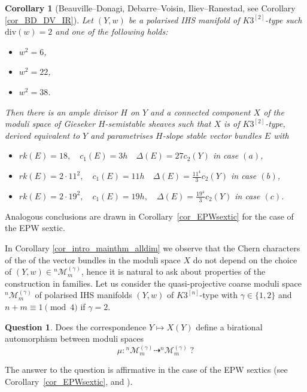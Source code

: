 \documentclass[12pt,a4paper]{amsart}
\theoremstyle{plain}
\newtheorem{maincor}[mainthm]{Corollary}
\theoremstyle{definition}
\newtheorem{mainquest}{Question}
\theoremstyle{remark}
\newcommand{\dv}{\mathrm{div}}
\newcommand{\cc}{c}
\begin{document}
\begin{maincor}[{Beauville--Donagi, Debarre--Voisin, Iliev--Ranestad, see Corollary \ref{cor_BD_DV_IR}}] Let $(Y,w)$ be a  polarised IHS manifold  of $K3^{[2]}$-type such $\dv(w)=2$ and one of the following holds:
\begin{itemize}
    \item [{\normalfont{(a)}}] $w^2=6$,
    \item [{\normalfont{(b)}}] $w^2=22$, 
    \item [{\normalfont{(c)}}] $w^2=38$.
\end{itemize}
Then there is an ample divisor $H$ on $Y$ and a connected component $X$ of the moduli space of Gieseker $H$-semistable sheaves such that $X$ is of $K3^{[2]}$-type, derived equivalent to $Y$ and parametrises $H$-slope stable vector bundles $E$ with
\begin{itemize}
    \item [{\normalfont{(a')}}] $rk(E)=18,\quad c_1(E)=3h \quad \Delta(E)=27\cc_2(Y)$ in case $(a)$,
    \item [{\normalfont{(b')}}] $rk(E)=2\cdot11^2,\quad c_1(E)=11h\quad \Delta(E)=\frac{11^4}{3}\cc_2(Y)$ in case $(b)$,
    \item [{\normalfont{(c')}}] $rk(E)=2\cdot19^2,\quad c_1(E)=19h,\quad \Delta(E)=\frac{19^4}{3}\cc_2(Y)$ in case $(c)$.
\end{itemize}
\end{maincor}
\noindent Analogous conclusions are drawn in Corollary~\ref{cor_EPWsextic} for the case of the EPW sextic.

In Corollary \ref{cor_intro_mainthm_alldim} we observe that the Chern characters of the of the vector bundles in the moduli space $X$ do not depend on the choice of $(Y,w)\in {}^{n}\mathcal{M}_m^{(\gamma)}$, hence it is natural to ask about properties of the construction in families.
Let us consider the quasi-projective coarse moduli space ${}^{n}\mathcal{M}_m^{(\gamma)}$ of polarised IHS manifolds $(Y,w)$ of $K3^{[n]}$-type with $\gamma\in \{1,2\}$ and $n+m\equiv 1 \pmod{4}$ if $\gamma=2$.
\begin{mainquest}
    Does the correspondence $Y\mapsto X(Y)$ define a birational automorphism between moduli spaces 
    \[
    \mu\colon {}^{n}\mathcal{M}_m^{(\gamma)} \dashrightarrow { {}^{n}\mathcal{M}_{m}^{(\gamma)}}\;?
    \]
\end{mainquest}
\noindent The answer to the question is affirmative in the case of the EPW sextics (see Corollary~\ref{cor_EPWsextic},  \cite[Section 4.2]{OG15} and  \cite[Proposition 5.2]{kapustka-kapustka-derived-equivalent-hk4}).
\end{document}
